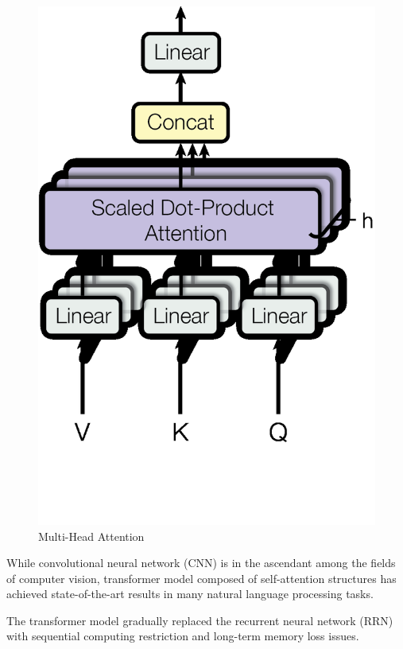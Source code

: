 \begin{minipage}[ht]{.35\textwidth}
\begin{figure}[H]
        \includegraphics[width=.9\textwidth]{literature/imgs/ext-attention-multihead.png}
        \vspace*{-.4cm}
        \caption{Multi-Head Attention \cite{vaswani2017attention}}
        \label{fig:ext-attention-multihead}
    \end{figure}
\end{minipage}

\citet{vaswani2017attention}

While convolutional neural network (CNN) is in the ascendant among the fields of computer vision, transformer model composed of self-attention structures has achieved state-of-the-art results in many natural language processing tasks.

\citet{devlin2019bert}

The transformer model gradually replaced the recurrent neural network (RRN) with sequential computing restriction and long-term memory loss issues.

